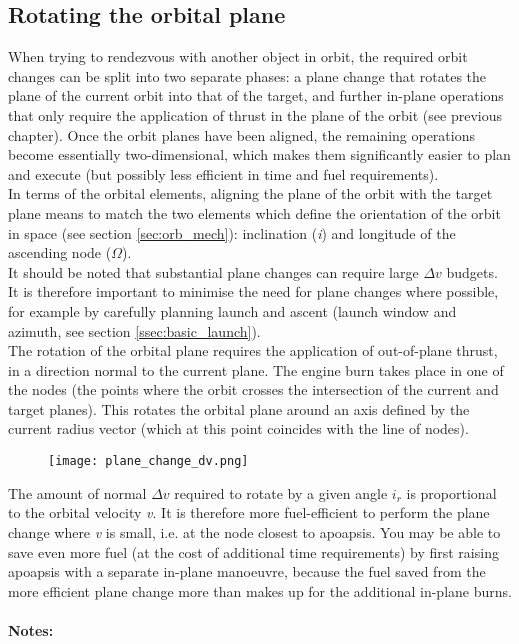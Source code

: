 \documentclass[Orbiter User Manual.tex]{subfiles}
\begin{document}
\subsection{Rotating the orbital plane}
\label{ssec:basic_plane}
When trying to rendezvous with another object in orbit, the required orbit changes can be split into two separate phases: a plane change that rotates the plane of the current orbit into that of the target, and further in-plane operations that only require the application of thrust in the plane of the orbit (see previous chapter). Once the orbit planes have been aligned, the remaining operations become essentially two-dimensional, which makes them significantly easier to plan and execute (but possibly less efficient in time and fuel requirements).\\
In terms of the orbital elements, aligning the plane of the orbit with the target plane means to match the two elements which define the orientation of the orbit in space (see section \ref{sec:orb_mech}): inclination (\textit{i}) and longitude of the ascending node ($\Omega$).\\
It should be noted that substantial plane changes can require large $\Delta v$ budgets. It is therefore important to minimise the need for plane changes where possible, for example by carefully planning launch and ascent (launch window and azimuth, see section \ref{ssec:basic_launch}).\\
The rotation of the orbital plane requires the application of out-of-plane thrust, in a direction normal to the current plane. The engine burn takes place in one of the nodes (the points where the orbit crosses the intersection of the current and target planes). This rotates the orbital plane around an axis defined by the current radius vector (which at this point coincides with the line of nodes).

\begin{figure}[H]
	\centering
	\texttt{[image: plane\_change\_dv.png]}
\end{figure}

\noindent
The amount of normal $\Delta v$ required to rotate by a given angle $i_{r}$ is proportional to the orbital velocity \textit{v}. It is therefore more fuel-efficient to perform the plane change where \textit{v} is small, i.e. at the node closest to apoapsis. You may be able to save even more fuel (at the cost of additional time requirements) by first raising apoapsis with a separate in-plane manoeuvre, because the fuel saved from the more efficient plane change more than makes up for the additional in-plane burns.\\
\\
\textbf{Notes:}
\end{document}
